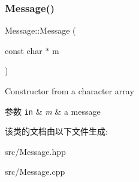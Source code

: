 \subsubsection{\texorpdfstring{Message()}{Message()}\hspace{0.1cm}{\footnotesize\ttfamily [2/2]}}
{\footnotesize\ttfamily Message\+::\+Message (\begin{DoxyParamCaption}\item[{const char $\ast$}]{m }\end{DoxyParamCaption})\hspace{0.3cm}{\ttfamily [inline]}}



Constructor from a character array 


\begin{DoxyParams}[1]{参数}
\mbox{\tt in}  & {\em m} & a message \\
\hline
\end{DoxyParams}


该类的文档由以下文件生成\+:\begin{DoxyCompactItemize}
\item 
src/Message.\+hpp\item 
src/Message.\+cpp\end{DoxyCompactItemize}
